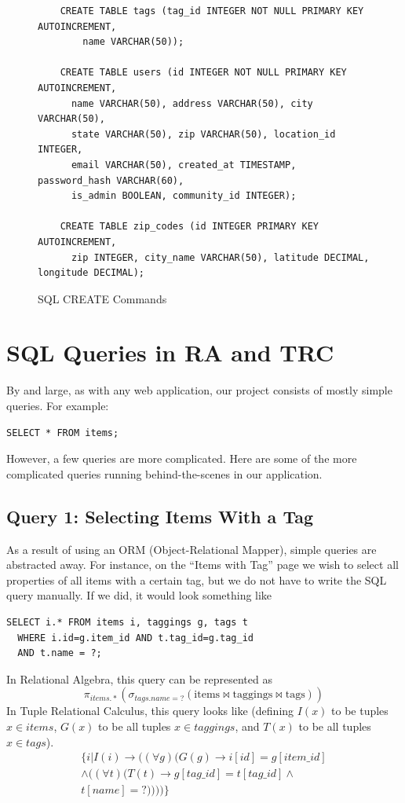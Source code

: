 \documentclass{acm_proc_article-sp}
\begin{document}
\begin{figure}[p]
\begin{lstlisting}
    CREATE TABLE tags (tag_id INTEGER NOT NULL PRIMARY KEY AUTOINCREMENT, 
        name VARCHAR(50));

    CREATE TABLE users (id INTEGER NOT NULL PRIMARY KEY AUTOINCREMENT, 
      name VARCHAR(50), address VARCHAR(50), city VARCHAR(50), 
      state VARCHAR(50), zip VARCHAR(50), location_id INTEGER, 
      email VARCHAR(50), created_at TIMESTAMP, password_hash VARCHAR(60), 
      is_admin BOOLEAN, community_id INTEGER);

    CREATE TABLE zip_codes (id INTEGER PRIMARY KEY AUTOINCREMENT, 
      zip INTEGER, city_name VARCHAR(50), latitude DECIMAL, longitude DECIMAL);
    \end{lstlisting}
    \caption{SQL CREATE Commands}
    \label{fig:SQLCreateCommands}
\end{figure}

\section{SQL Queries in RA and TRC}
By and large, as with any web application, our project consists of mostly simple queries. For example:

\begin{lstlisting}
SELECT * FROM items;
\end{lstlisting}

However, a few queries are more complicated. Here are some of the more complicated queries running behind-the-scenes
in our application.

\subsection{Query 1: Selecting Items With a Tag}
As a result of using an ORM (Object-Relational Mapper), simple queries are abstracted away. 
For instance, on the ``Items with Tag'' page we wish to select all properties of
all items with a certain tag, but we do not have to write the SQL query manually. If we did, it would look something
like
\lstset{language=SQL}
\begin{lstlisting}
SELECT i.* FROM items i, taggings g, tags t 
  WHERE i.id=g.item_id AND t.tag_id=g.tag_id 
  AND t.name = ?;
\end{lstlisting}

In Relational Algebra, this query can be represented as
\[ \pi_{items.*}(\sigma_{tags.name=?}(\text{items}\bowtie\text{taggings}\bowtie\text{tags})) \]
In Tuple Relational Calculus, this query looks like (defining $I(x)$ to be tuples $x \in \textit{items}$,
$G(x)$ to be all tuples $x \in \textit{taggings}$, and $T(x)$ to be all tuples $x \in \textit{tags}$).
\begin{displaymath}
\begin{split} 
\{i | I(i) \to ((\forall g)(G(g) \to i[id] = g[item\_id] \\
\land ((\forall t)(T(t) \to g[tag\_id] = t[tag\_id] \land \\
t[name] = ?))))\}
\end{split}
\end{displaymath}
\end{document}
